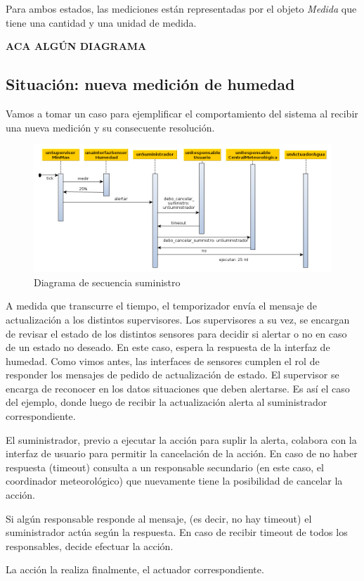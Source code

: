 Para ambos estados, las mediciones están representadas por el objeto \textit{Medida} que  tiene una cantidad y una unidad de medida.

\textbf{ACA ALGÚN DIAGRAMA}



\subsection{Situación: nueva medición de humedad}
Vamos a tomar un caso para ejemplificar el comportamiento del sistema al recibir una nueva medición y su consecuente resolución.

\begin{figure}[h!]
  \centering
  \includegraphics[width=1\textwidth]{./imagenes/secuencia_suministro1.png}
  \caption{Diagrama de secuencia suministro}
  \label{fig:sec_sum1}
\end{figure}

A medida que transcurre el tiempo, el temporizador envía el mensaje de actualización a los distintos supervisores. 
Los supervisores a su vez, se encargan de revisar el estado de los distintos sensores para decidir si alertar o no en caso de un estado no deseado.
En este caso, espera la respuesta de la interfaz de humedad. Como vimos antes, las interfaces de sensores cumplen el rol de responder los mensajes de pedido de actualización de estado. 
El supervisor se encarga de reconocer en los datos situaciones que deben alertarse. Es así el caso del ejemplo, donde luego de recibir la actualización alerta al suministrador correspondiente.

El suministrador, previo a ejecutar la acción para suplir la alerta, colabora con la interfaz de usuario para permitir la cancelación de la acción. En caso de no haber respuesta (timeout) consulta a un responsable secundario (en este caso, el coordinador meteorológico) que nuevamente tiene la posibilidad de cancelar la acción.

Si algún responsable responde al mensaje, (es decir, no hay timeout) el suministrador actúa según la respuesta. En caso de recibir timeout de todos los responsables, decide efectuar la acción.

La acción la realiza finalmente, el actuador correspondiente.